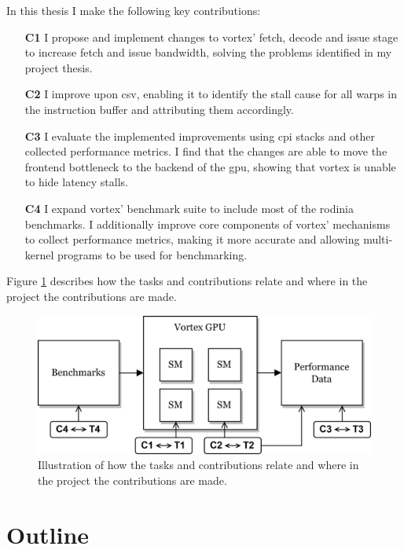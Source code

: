 In this thesis I make the following key contributions:
\begin{itemize}
    \item[\textbf{C1}] I propose and implement changes to \Gls{vortex}' fetch, decode and issue stage to increase fetch and issue bandwidth, solving the problems identified in my project thesis.
    \item[\textbf{C2}] I improve upon \acrshort{csv}, enabling it to identify the stall cause for all warps in the instruction buffer and attributing them accordingly.
    \item[\textbf{C3}] I evaluate the implemented improvements using \acrshort{cpi} stacks and other collected performance metrics. I find that the changes are able to move the frontend bottleneck to the backend of the \Gls{gpu}, showing that \Gls{vortex} is unable to hide latency stalls.
    \item[\textbf{C4}] I expand \Gls{vortex}' benchmark suite to include most of the \Gls{rodinia} benchmarks. I additionally improve core components of \Gls{vortex}' mechanisms to collect performance metrics, making it more accurate and allowing multi-kernel programs to be used for benchmarking.  
\end{itemize}

Figure \ref{fig:task-contribution} describes how the tasks and contributions relate and where in the project the contributions are made.

\begin{figure}
    \centering
    \includegraphics[width=\textwidth]{figures/task-contribution-2.png}
    \caption[Relating tasks and contributions to the project.]{Illustration of how the tasks and contributions relate and where in the project the contributions are made.}
    \label{fig:task-contribution}
\end{figure}

\section{Outline}

